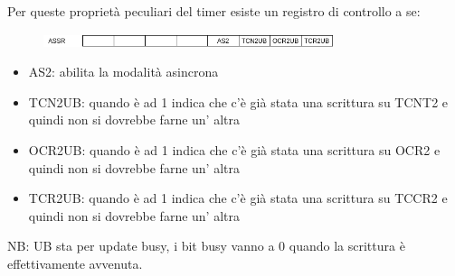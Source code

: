 Per queste proprietà peculiari del timer esiste un registro di controllo a se:
\begin{figure}[H]
    \centering
    \includegraphics[width=320px]{images/18_Timer/ASSR.png}
\end{figure}
\begin{itemize}
    \item AS2: abilita la modalità asincrona
    \item TCN2UB: quando è ad 1 indica che c'è già stata una scrittura su TCNT2 e quindi non si dovrebbe farne un' altra
    \item OCR2UB: quando è ad 1 indica che c'è già stata una scrittura su OCR2 e quindi non si dovrebbe farne un' altra
    \item TCR2UB: quando è ad 1 indica che c'è già stata una scrittura su TCCR2 e quindi non si dovrebbe farne un' altra
\end{itemize}
NB: UB sta per update busy, i bit busy vanno a 0 quando la scrittura è effettivamente avvenuta.


